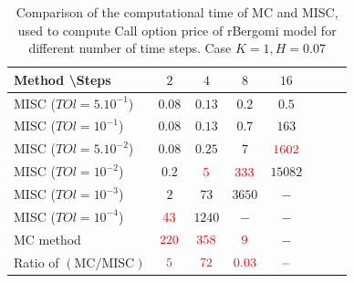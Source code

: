 \documentclass[11pt]{article}
\begin{document}
\begin{table}[h!]
	\centering
	\begin{tabular}{l*{6}{c}r}
		Method \textbackslash  Steps            & $2$ & $4$ & $8$ & $16$ &   \\
		\hline
		MISC ($TOl=5.10^{-1}$)  & $0.08$ & $0.13$ & $0.2$ & $0.5$  \\
		MISC ($TOl=10^{-1}$)  & $0.08$ & $0.13$ & $0.7$ & $163$  \\
		MISC ($TOl=5.10^{-2}$)  & $0.08$ & $0.25$ & $7$ & ${\color{red}1602}$  \\
		MISC ($TOl=10^{-2}$)  & $0.2$& ${\color{red}5}$ & ${\color{red}333}$ & $15082$  \\
		MISC ($TOl=10^{-3}$)  &  $2$ & $73$ & $3650$ & $-$  \\		
		MISC ($TOl=10^{-4}$)  & ${\color{red}43}$ & $1240$ & $-$ & $-$  \\	
		\hline
		MC method & ${\color{red}220}$  & ${\color{red}358}$  & ${\color{red}9}$ & $-$  \\
		\hline	
		Ratio of $\left(\text{MC}/ \text{MISC} \right)$  &${\color{red}5}$ & ${\color{red}   72 
		}$  & ${\color{red}  0.03	}$  & ${\color{red}-}$ \\
		\hline
	\end{tabular}
	\caption{Comparison of the computational time of  MC and MISC, used to compute Call option price of rBergomi model for different number of time steps. Case $K=1, H=0.07$}
	\label{Comparsion of the computational time of  MC and MISC, used to compute Call option price of rBergomi model for different number of time steps. Case $K=1, H=0.07$, linear}
\end{table}
\end{document}
